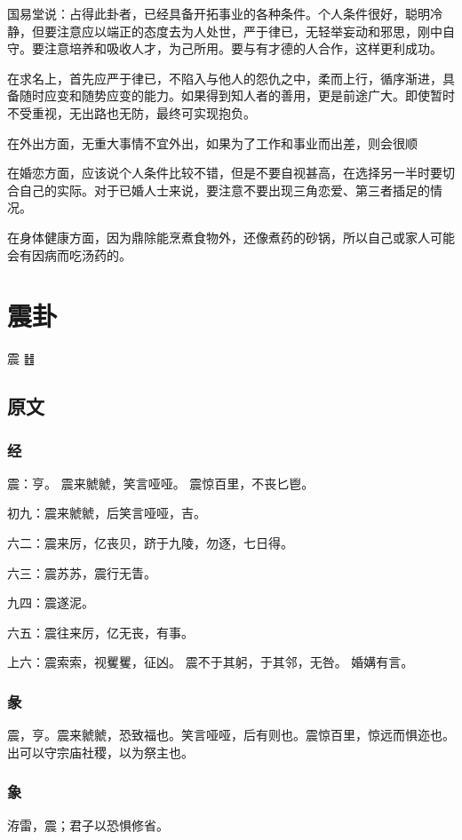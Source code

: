 \documentclass[12pt,oneside]{book}
\begin{document}
国易堂说：占得此卦者，已经具备开拓事业的各种条件。个人条件很好，聪明冷静，但要注意应以端正的态度去为人处世，严于律已，无轻举妄动和邪思，刚中自守。要注意培养和吸收人才，为己所用。要与有才德的人合作，这样更利成功。

在求名上，首先应严于律已，不陷入与他人的怨仇之中，柔而上行，循序渐进，具备随时应变和随势应变的能力。如果得到知人者的善用，更是前途广大。即使暂时不受重视，无出路也无防，最终可实现抱负。

在外出方面，无重大事情不宜外出，如果为了工作和事业而出差，则会很顺

在婚恋方面，应该说个人条件比较不错，但是不要自视甚高，在选择另一半时要切合自己的实际。对于已婚人士来说，要注意不要出现三角恋爱、第三者插足的情况。

在身体健康方面，因为鼎除能烹煮食物外，还像煮药的砂锅，所以自己或家人可能会有因病而吃汤药的。




\chapter{震卦}
震 {\large ䷲}
\section{原文}

\subsection{经}
震：亨。 震来虩虩，笑言哑哑。 震惊百里，不丧匕鬯。

初九：震来虩虩，后笑言哑哑，吉。

六二：震来厉，亿丧贝，跻于九陵，勿逐，七日得。

六三：震苏苏，震行无眚。

九四：震遂泥。

六五：震往来厉，亿无丧，有事。

上六：震索索，视矍矍，征凶。 震不于其躬，于其邻，无咎。 婚媾有言。

\subsection{彖}
震，亨。震来虩虩，恐致福也。笑言哑哑，后有则也。震惊百里，惊远而惧迩也。 出可以守宗庙社稷，以为祭主也。

\subsection{象}
洊雷，震；君子以恐惧修省。
\end{document}
